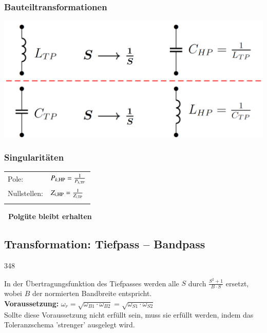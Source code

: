 \begin{minipage}[t]{0.48\columnwidth}
    \subsubsection{Bauteiltransformationen}

    \includegraphics[width=\columnwidth]{images/bauteiltransformation_TP_HP.png}
\end{minipage}
\hfill
\begin{minipage}[t]{0.48\columnwidth}
    \subsubsection{Singularitäten}

    \begin{tabular}{ll}
        Pole:           & $P_{k, \rm HP} = \frac{1}{P_{k, \rm TP}}$ \\
        Nullstellen:    & $Z_{i, \rm HP} = \frac{1}{Z_{i, \rm TP}}$ \\
        \\
    \end{tabular}

    \textbf{\textrightarrow\ Polgüte bleibt erhalten}
\end{minipage}


\subsection{Transformation: Tiefpass -- Bandpass}{348}

In der Übertragungsfunktion des Tiefpasses werden alle $S$ durch $\frac{S^2  + 1}{B \cdot S}$ ersetzt, wobei $B$ der normierten
Bandbreite entspricht. \\
\textbf{Voraussetzung:} $\omega_r = \sqrt{\omega_{B1} \cdot \omega_{B2}} = \sqrt{\omega_{S1} \cdot \omega_{S2} } $\\
Sollte diese Voraussetzung nicht erfüllt sein, muss sie erfüllt werden, indem das Toleranzschema 'strenger' ausgelegt wird.


